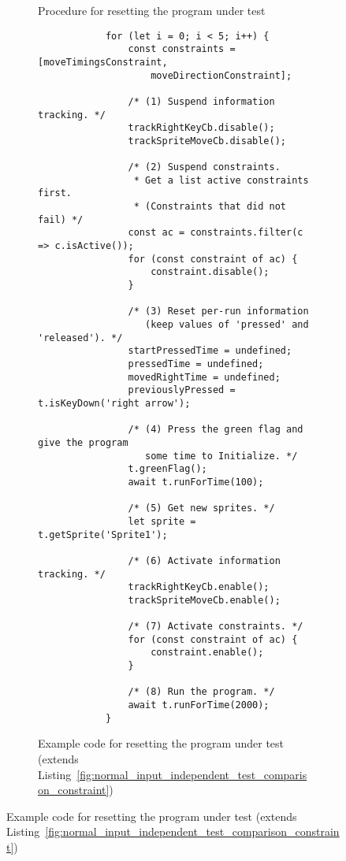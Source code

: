 \begin{figure}[htpb]
\begin{subfigure}[m]{.3\textwidth}
\begin{tikzpicture}[scale=0.9, every node/.style={scale=0.9}]
        \end{tikzpicture}
        \caption{Procedure for resetting the program under test}
        \label{fig:resetting_the_program_under_test_procedure}
    \end{subfigure}%
    \hspace{.13\textwidth}%
    \begin{subfigure}[m]{.55\textwidth}
        \centering
        \begin{verbatim}
            for (let i = 0; i < 5; i++) {
                const constraints = [moveTimingsConstraint,
                    moveDirectionConstraint];

                /* (1) Suspend information tracking. */
                trackRightKeyCb.disable();
                trackSpriteMoveCb.disable();

                /* (2) Suspend constraints.
                 * Get a list active constraints first.
                 * (Constraints that did not fail) */
                const ac = constraints.filter(c => c.isActive());
                for (const constraint of ac) {
                    constraint.disable();
                }

                /* (3) Reset per-run information
                   (keep values of 'pressed' and 'released'). */
                startPressedTime = undefined;
                pressedTime = undefined;
                movedRightTime = undefined;
                previouslyPressed = t.isKeyDown('right arrow');

                /* (4) Press the green flag and give the program
                   some time to Initialize. */
                t.greenFlag();
                await t.runForTime(100);

                /* (5) Get new sprites. */
                let sprite = t.getSprite('Sprite1');

                /* (6) Activate information tracking. */
                trackRightKeyCb.enable();
                trackSpriteMoveCb.enable();

                /* (7) Activate constraints. */
                for (const constraint of ac) {
                    constraint.enable();
                }

                /* (8) Run the program. */
                await t.runForTime(2000);
            }
        \end{verbatim}
        \vspace{-\bigskipamount}
        \caption{Example code for resetting the program under test (extends Listing~\ref{fig:normal_input_independent_test_comparison_constraint})}
        \label{fig:resetting_the_program_under_test_example}
    \end{subfigure}


\end{figure}
